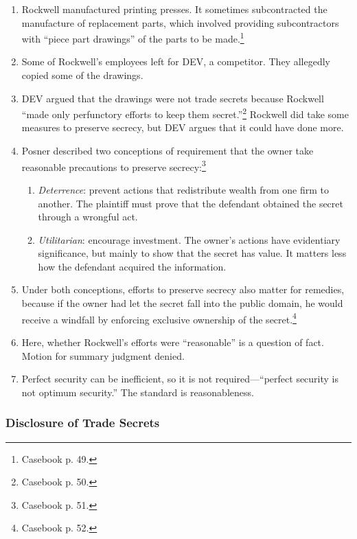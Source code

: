 
\begin{enumerate}
    \item Rockwell manufactured printing presses. It sometimes subcontracted 
    the manufacture of replacement parts, which involved providing 
    subcontractors with ``piece part drawings'' of the parts to be 
    made.\footnote{Casebook p. 49.}
    \item Some of Rockwell's employees left for DEV, a competitor. They 
    allegedly copied some of the drawings.
    \item DEV argued that the drawings were not trade secrets because Rockwell 
    ``made only perfunctory efforts to keep them secret.''\footnote{Casebook 
    p. 50.} Rockwell did take some measures to preserve secrecy, but DEV 
    argues that it could have done more.
    \item Posner described two conceptions of requirement that the owner take 
    reasonable precautions to preserve secrecy:\footnote{Casebook p. 51.}
    \begin{enumerate}
        \item \emph{Deterrence}: prevent actions that redistribute wealth from 
        one firm to another. The plaintiff must prove that the defendant 
        obtained the secret through a wrongful act.
        \item \emph{Utilitarian}: encourage investment. The owner's actions 
        have evidentiary significance, but mainly to show that the secret has 
        value. It matters less how the defendant acquired the information.
    \end{enumerate}
    \item Under both conceptions, efforts to preserve secrecy also matter for 
    remedies, because if the owner had let the secret fall into the public 
    domain, he would receive a windfall by enforcing exclusive ownership of 
    the secret.\footnote{Casebook p. 52.}
    \item Here, whether Rockwell's efforts were ``reasonable'' is a question 
    of fact. Motion for summary judgment denied.
    \item Perfect security can be inefficient, so it is not 
    required---``perfect security is not optimum security.'' The standard is 
    reasonableness.
\end{enumerate}

\newpage

\subsubsection{Disclosure of Trade Secrets}


